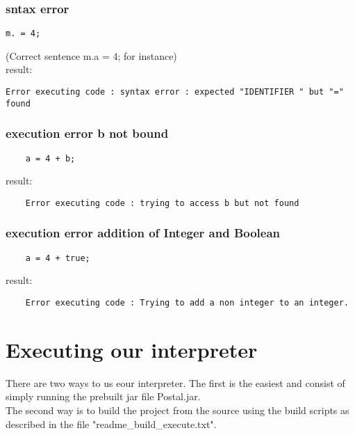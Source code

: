 \documentclass{eplDoc}
\begin{document}
\subsubsection{sntax error}
\begin{lstlisting}
m. = 4;   
\end{lstlisting}
(Correct sentence m.a = 4; for instance) \\
result:
\begin{lstlisting}
Error executing code : syntax error : expected "IDENTIFIER " but "=" found
\end{lstlisting}
\subsubsection{execution error b not bound}
\begin{lstlisting}
    a = 4 + b;
\end{lstlisting}
result:
\begin{lstlisting}
    Error executing code : trying to access b but not found
\end{lstlisting}
\subsubsection{execution error addition of Integer and Boolean}
\begin{lstlisting}
    a = 4 + true;
\end{lstlisting}
result:
\begin{lstlisting}
    Error executing code : Trying to add a non integer to an integer.
\end{lstlisting}

\section{Executing our interpreter}
There are two ways to us eour interpreter. The first is the easiest and consist of simply running the prebuilt jar file Postal.jar. \\ 
The second way is to build the project from the source using the build scripts as described in the file "readme\_build\_execute.txt".
\end{document}
